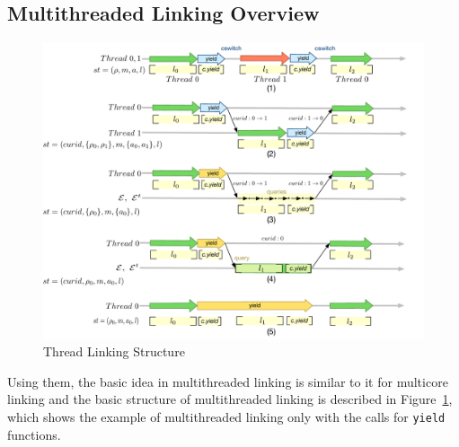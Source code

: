 
\subsection{Multithreaded Linking Overview}
\label{chapter:linking:subsec:multithreaded-linking-overview}

\begin{figure}
\begin{center}
\includegraphics[width=\textwidth]{figs/conlink/thread-linking}
\end{center}
\caption{Thread Linking Structure}
\label{fig:chapter:conlink:threadlinking}
\end{figure}

Using them, the basic idea in multithreaded linking is similar to it for multicore linking and the
 basic structure of multithreaded linking is described in Figure~\ref{fig:chapter:conlink:threadlinking}, 
 which shows the example of multithreaded linking only with the calls for \lstinline$yield$ functions.
 
